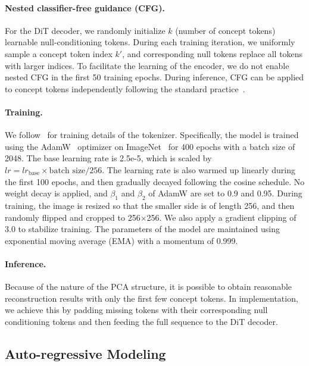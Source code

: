 \documentclass[10pt,twocolumn,letterpaper]{article}
\begin{document}
\paragraph{Nested classifier-free guidance (CFG).}
For the DiT decoder, we randomly initialize $k$ (number of concept tokens) learnable null-conditioning tokens. During each training iteration, we uniformly sample a concept token index $k'$, and corresponding null tokens replace all tokens with larger indices. To facilitate the learning of the encoder, we do not enable nested CFG in the first 50 training epochs. During inference, CFG can be applied to concept tokens independently following the standard practice~\cite{dit}.

\paragraph{Training.}
We follow~\cite{RCG} for training details of the tokenizer. Specifically, the model is trained using the AdamW~\cite{adamw} optimizer on ImageNet~\cite{imagenet} for 400 epochs with a batch size of 2048. The base learning rate is 2.5e-5, which is scaled by $lr = lr_\text{base} \times \text{batch size}/256$. The learning rate is also warmed up linearly during the first 100 epochs, and then gradually decayed following the cosine schedule. No weight decay is applied, and $\beta_1$ and $\beta_2$ of AdamW are set to 0.9 and 0.95. During training, the image is resized so that the smaller side is of length 256, and then randomly flipped and cropped to 256$\times$256. We also apply a gradient clipping of 3.0 to stabilize training. The parameters of the model are maintained using exponential moving average (EMA) with a momentum of 0.999.

\paragraph{Inference.}
Because of the nature of the PCA structure, it is possible to obtain reasonable reconstruction results with only the first few concept tokens. In implementation, we achieve this by padding missing tokens with their corresponding null conditioning tokens and then feeding the full sequence to the DiT decoder.

\subsection{Auto-regressive Modeling}
\end{document}
